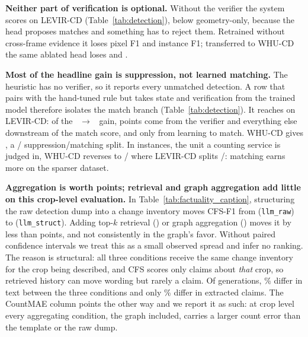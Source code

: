 \textbf{Neither part of verification is optional.} Without the verifier the
system scores \EOneNoVerifierFOne{} on LEVIR-CD (Table~\ref{tab:detection}),
below geometry-only, because
the head proposes matches and something has to reject them. Retrained without
cross-frame evidence it loses \EOneCrossFrameGain{} pixel F1 and
\EOneCrossFrameInstGain{} instance F1; transferred to
WHU-CD the same ablated head loses \ETwoCrossFrameGain{} and
\ETwoCrossFrameInstGain.

\textbf{Most of the headline gain is suppression, not learned matching.} The
heuristic has no verifier, so it reports every unmatched detection. A row that
pairs with the hand-tuned rule but takes state and verification from the trained
model therefore isolates the match branch (Table~\ref{tab:detection}). It reaches
\EOneHybridFOne{} on LEVIR-CD: of the
\EOneHeuristicFOne{}~$\rightarrow$~\EOnePixelFOne{} gain,
\EOneSuppressionGain{} points come from the verifier and everything else
downstream of the match score, and only \EOneMatchGain{} from learning to
match. WHU-CD gives \ETwoHybridFOne, a
\ETwoSuppressionGain{}/\ETwoMatchGain{} suppression/matching split. In instances, the unit a
counting service is judged in, WHU-CD reverses to
\ETwoSuppressionInstGain{}/\ETwoMatchInstGain{} where LEVIR-CD splits
\EOneSuppressionInstGain{}/\EOneMatchInstGain: matching earns more on the
sparser dataset.

\textbf{Aggregation is worth \EFourAggGain{} points; retrieval and graph
aggregation add little on this crop-level evaluation.} In
Table~\ref{tab:factuality_caption}, structuring the raw detection dump into a
change inventory moves CFS-F1 from \EFourRawFOne{} (\texttt{llm\_raw}) to
\EFourStructFOne{} (\texttt{llm\_struct}). Adding
top-$k$ retrieval (\EFourFlatRagFOne) or graph aggregation
(\EFourGraphRAGFOne) moves it by less than \EFourLadderSpread{} points, and not
consistently in the graph's favor. Without paired confidence intervals we treat
this as a small observed spread and infer no ranking. The reason is structural:
all three conditions receive the same change inventory for the crop being
described, and CFS scores only claims about \emph{that} crop, so retrieved
history can move wording but rarely a claim. Of \EFourNCrops{} generations,
\EFourTextDifferPct\% differ in text between the three conditions and only
\EFourClaimsDifferPct\% differ in extracted claims. The CountMAE column points
the other way and we report it as such: at crop level every aggregating condition, the graph included, carries a
larger count error than the template or the raw dump.

